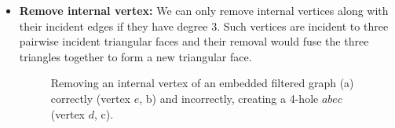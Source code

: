 \begin{itemize}
	\item \textbf{Remove internal vertex:} We can only remove internal vertices along with their incident edges if they have degree 3. Such vertices are incident to three pairwise incident triangular faces and their removal would fuse the three triangles together to form a new triangular face.
\begin{figure}[H]
	\centering
	\quad
	\quad
	\caption{Removing an internal vertex of an embedded filtered graph (a) correctly (vertex $e$, b) and incorrectly, creating a 4-hole $abec$ (vertex $d$, c).}
	\label{fig:transformation}
\end{figure}


\end{itemize}
